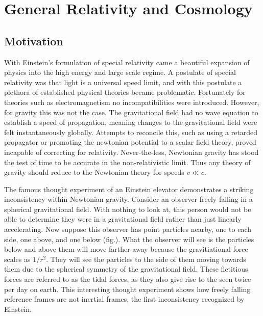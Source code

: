 \chapter{General Relativity and Cosmology}
\section{Motivation}
With Einstein's formulation of special relativity came a beautiful expansion of physics into the high energy and large scale regime. A postulate of special relativity was that light is a universal speed limit, and with this postulate a plethora of established physical theories became problematic. Fortunately for theories such as electromagnetism no incompatibilities were introduced. However, for gravity this was not the case. The gravitational field had no wave equation to establish a speed of propagation, meaning changes to the gravitational field were felt instantaneously globally. Attempts to reconcile this, such as using a retarded propagator or promoting the newtonian potential to a scalar field theory, proved incapable of correcting for relativity. Never-the-less, Newtonian gravity has stood the test of time to be accurate in the non-relativistic limit. Thus any theory of gravity should reduce to the Newtonian theory for speeds $v \ll c$.

The famous thought experiment of an Einstein elevator demonstrates a striking inconsistency within Newtonian gravity. Consider an observer freely falling in a spherical gravitational field. With nothing to look at, this person would not be able to determine they were in a gravitational field rather than just linearly accelerating. Now suppose this observer has point particles nearby, one to each side, one above, and one below (fig.). What the observer will see is the particles below and above them will move farther away because the gravitiational force scales as $1/r^2$. They will see the particles to the side of them moving towards them due to the spherical symmetry of the gravitational field. These fictitious forces are referred to as the tidal forces, as they also give rise to the seen twice per day on earth. This interesting thought experiment shows how freely falling reference frames are not inertial frames, the first inconsistency recognized by Einstein. 

